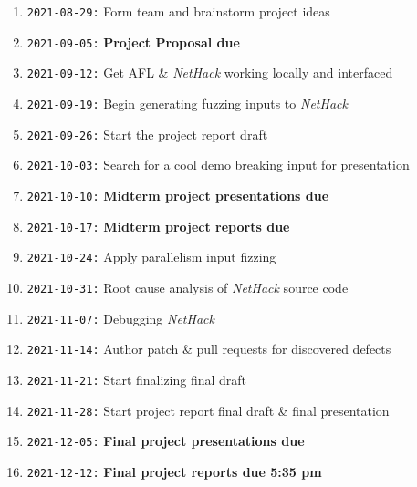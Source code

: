 \documentclass[12pt]{diazessay}
\begin{document}
\begin{enumerate}[label={}]
	\item \texttt{2021-08-29:} Form team and brainstorm project ideas
	\item \texttt{2021-09-05:} \textbf{Project Proposal due}
	\item \texttt{2021-09-12:} Get AFL \& \emph{NetHack} working locally and interfaced
	\item \texttt{2021-09-19:} Begin generating fuzzing inputs to \emph{NetHack}
	\item \texttt{2021-09-26:} Start the project report draft
	\item \texttt{2021-10-03:} Search for a cool demo breaking input for presentation
	\item \texttt{2021-10-10:} \textbf{Midterm project presentations due}
	\item \texttt{2021-10-17:} \textbf{Midterm project reports due}
	\item \texttt{2021-10-24:} Apply parallelism input fizzing
	\item \texttt{2021-10-31:} Root cause analysis of \emph{NetHack} source code
	\item \texttt{2021-11-07:} Debugging \emph{NetHack}
	\item \texttt{2021-11-14:} Author patch \& pull requests for discovered defects
	\item \texttt{2021-11-21:} Start finalizing final draft
	\item \texttt{2021-11-28:} Start project report final draft \& final presentation
	\item \texttt{2021-12-05:} \textbf{Final project presentations due}
	\item \texttt{2021-12-12:} \textbf{Final project reports due 5:35 pm}
\end{enumerate}


\clearpage


\end{document}
